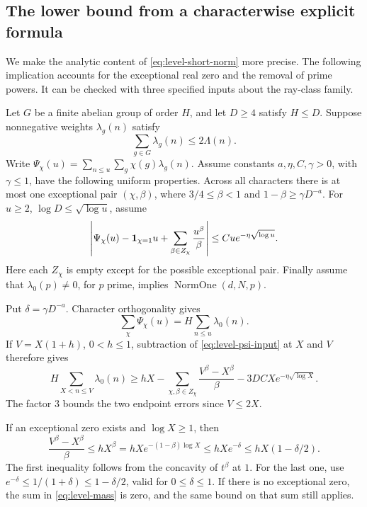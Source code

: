 \subsection{The lower bound from a characterwise explicit formula}

We make the analytic content of \eqref{eq:level-short-norm} more
precise. The following implication accounts for the exceptional real
zero and the removal of prime powers. It can be checked with three
specified inputs about the ray-class family.

Let \(G\) be a finite abelian group of order \(H\), and let \(D\geq4\)
satisfy \(H\leq D\). Suppose nonnegative weights \(\lambda_g(n)\)
satisfy
\[
             \sum_{g\in G}\lambda_g(n)\leq2\Lambda(n).
\]
Write
\(\Psi_\chi(u)=\sum_{n\leq u}\sum_g\chi(g)\lambda_g(n)\).
Assume constants \(a,\eta,C,\gamma>0\), with \(\gamma\leq1\),
have the following uniform properties.
Across all characters there is at most one exceptional pair
\((\chi,\beta)\), where \(3/4\leq\beta<1\) and
\(1-\beta\geq\gamma D^{-a}\).
For \(u\geq2\), \(\log D\leq\sqrt{\log u}\), assume
\begin{equation}
 \label{eq:level-psi-input}
 \left|\Psi_\chi(u)-{\bf1}_{\chi=1}u+
               \sum_{\beta\in Z_\chi}\frac{u^\beta}{\beta}\right|
             \leq Cu e^{-\eta\sqrt{\log u}}.
\end{equation}
Here each \(Z_\chi\) is empty except for the possible exceptional
pair. Finally assume that
\(\lambda_0(p)\ne0\), for \(p\) prime, implies
\(\operatorname{NormOne}(d,N,p)\).

Put \(\delta=\gamma D^{-a}\).
Character orthogonality gives
\[
              \sum_\chi\Psi_\chi(u)
                        =H\sum_{n\leq u}\lambda_0(n).
\]
If \(V=X(1+h)\), \(0<h\leq1\), subtraction of
\eqref{eq:level-psi-input} at \(X\) and \(V\) therefore gives
\begin{equation}
 \label{eq:level-mass}
 H\sum_{X<n\leq V}\lambda_0(n)
 \geq hX-\sum_{\chi,\beta\in Z_\chi}
          \frac{V^\beta-X^\beta}{\beta}
                  -3DCX e^{-\eta\sqrt{\log X}}.
\end{equation}
The factor \(3\) bounds the two endpoint errors since \(V\leq2X\).

If an exceptional zero exists and \(\log X\geq1\), then
\[
 \frac{V^\beta-X^\beta}{\beta}
       \leq hX^\beta
       =hX e^{-(1-\beta)\log X}
       \leq hX e^{-\delta}
       \leq hX(1-\delta/2).
\]
The first inequality follows from the concavity of
\(t^\beta\) at \(1\). For the last one, use
\(e^{-\delta}\leq1/(1+\delta)\leq1-\delta/2\), valid for
\(0\leq\delta\leq1\). If there is no exceptional zero, the sum
in \eqref{eq:level-mass} is zero, and the same bound on that sum
still applies.

